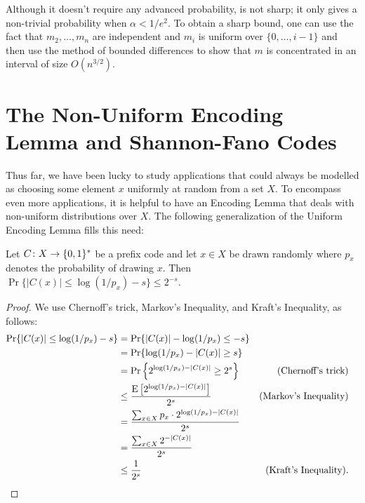 \documentclass{patmorin}
\begin{document}
\begin{rem}
  Although it doesn't require any advanced probability,
   is not sharp; it only gives a non-trivial
  probability when $\alpha < 1/e^2$.  To obtain a sharp bound, one can
  use the fact that $m_2,\ldots,m_n$ are independent and $m_i$ is uniform
  over $\{0,\ldots,i-1\}$ and then use the method of bounded differences
  \cite{mcdiarmid:on} to show that $m$ is concentrated in an interval
  of size $O(n^{3/2})$.
\end{rem}




\section{The Non-Uniform Encoding Lemma and Shannon-Fano Codes}

Thus far, we have been lucky to study applications that could always
be modelled as choosing some element $x$ uniformly at random from a
set $X$. To encompass even more applications, it is helpful to have
an Encoding Lemma that deals with non-uniform distributions over $X$.
The following generalization of the Uniform Encoding Lemma fills this
need:

\begin{lem}  
  Let $C\colon X\to\{0,1\}^*$ be a prefix code and let $x\in X$ be
  drawn randomly where $p_x$ denotes the probability of drawing $x$.
  Then $\Pr\{ |C(x)| \le \log(1/p_x)-s\} \le 2^{-s}$.
\end{lem}

\begin{proof}
  We use Chernoff's trick, Markov's Inequality, and Kraft's Inequality,
  as follows: 
  \begin{align*}
     \Pr\{ |C(x)| \le\log(1/p_x)-s \} 
      & = \Pr\{|C(x)| -\log(1/p_x) \le -s \} \\
      & = \Pr\{\log(1/p_x)-|C(x)| \ge s \} \\
      & = \Pr\left\{2^{\log(1/p_x)-|C(x)|} \ge 2^s \right\} & \text{(Chernoff's trick)} \\
      & \le \frac{\mathrm{E}\left[2^{\log(1/p_x)-|C(x)|}\right]}{2^s} & \text{(Markov's Inequality)} \\
      & = \frac{\sum_{x\in X}p_x\cdot 2^{\log(1/p_x)-|C(x)|}}{2^s} \\
      & = \frac{\sum_{x\in X}2^{-|C(x)|}}{2^s} \\
      & \le \frac{1}{2^s} & \text{(Kraft's Inequality).}  & \qedhere
  \end{align*}
\end{proof}
\end{document}

